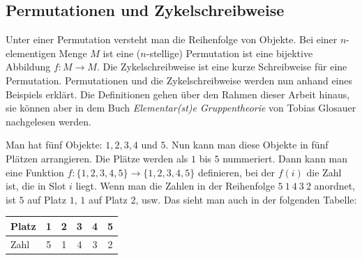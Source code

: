 \documentclass[12pt,a4paper, usenames, dvipsnames]{article}
\theoremstyle{mystyle}
\theoremstyle{definition}
\begin{document}
\subsection*{Permutationen und Zykelschreibweise} 
\label{11}
Unter einer Permutation versteht man die Reihenfolge von Objekte. Bei einer $n$-elementigen Menge $M$ ist eine ($n$-stellige) Permutation ist eine bijektive Abbildung $f: M \rightarrow M$. Die Zykelschreibweise ist eine kurze Schreibweise für eine Permutation.
Permutationen und die Zykelschreibweise werden nun anhand eines Beispiels erklärt. Die Definitionen gehen über den Rahmen dieser Arbeit hinaus, sie können aber in dem Buch \textit{Elementar(st)e Gruppentheorie} von Tobias Glosauer \cite{Buch} nachgelesen werden.

Man hat fünf Objekte: $1, 2, 3, 4$ und $5$. Nun kann man diese Objekte in fünf Plätzen arrangieren. Die Plätze werden als $1$ bis $5$ nummeriert. Dann kann man eine Funktion $f:\{1,2,3,4,5\} \rightarrow \{1,2,3,4,5\}$ definieren, bei der $f(i)$ die Zahl ist, die in Slot $i$ liegt.
Wenn man die Zahlen in der Reihenfolge $5 \ 1\ 4\ 3 \ 2$ anordnet, ist $5$ auf Platz $1$, $1$ auf Platz $2$, usw. Das sieht man auch in der folgenden Tabelle: 

\begin{center}
\begin{tabular}{l ccccc}

Platz & 1 & 2 & 3 & 4 & 5 \\
\midrule
Zahl & 5 & 1 & 4 & 3 & 2 \\

\end{tabular}
\end{center}
\end{document}
